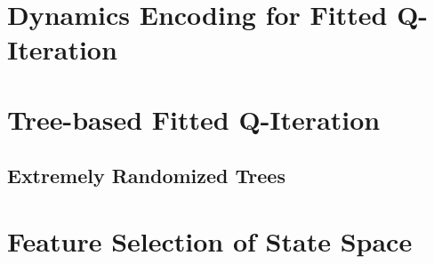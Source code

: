 \section{Dynamics Encoding for Fitted Q-Iteration}

\section{Tree-based Fitted Q-Iteration}
\subsection{Extremely Randomized Trees}

\section{Feature Selection of State Space}